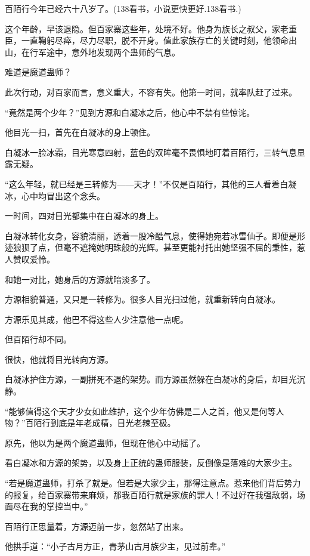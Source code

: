 
\begin{this_body}

百陌行今年已经六十八岁了。(138看书，小说更快更好.138看书.)

这个年龄，早该退隐。但百家寨这些年，处境不好。他身为族长之叔父，家老重臣，一直鞠躬尽瘁，尽力尽职，脱不开身。值此家族存亡的关键时刻，他领命出山，在行军途中，意外地发现两个蛊师的气息。

难道是魔道蛊师？

此次行动，对百家而言，意义重大，不容有失。他第一时间，就率队赶了过来。

“竟然是两个少年？”见到方源和白凝冰之后，他心中不禁有些惊诧。

他目光一扫，首先在白凝冰的身上顿住。

白凝冰一脸冰霜，目光寒意四射，蓝色的双眸毫不畏惧地盯着百陌行，三转气息显露无疑。

“这么年轻，就已经是三转修为——天才！”不仅是百陌行，其他的三人看着白凝冰，心中均冒出这个念头。

一时间，四对目光都集中在白凝冰的身上。

白凝冰转化女身，容貌清丽，透着一股冷酷气息，使得她宛若冰雪仙子。即便是形迹狼狈了点，但毫不遮掩她明珠般的光辉。甚至更能衬托出她坚强不屈的秉性，惹人赞叹爱怜。

和她一对比，她身后的方源就暗淡多了。

方源相貌普通，又只是一转修为。很多人目光扫过他，就重新转向白凝冰。

方源乐见其成，他巴不得这些人少注意他一点呢。

但百陌行却不同。

很快，他就将目光转向方源。

白凝冰护住方源，一副拼死不退的架势。而方源虽然躲在白凝冰的身后，却目光沉静。

“能够值得这个天才少女如此维护，这个少年仿佛是二人之首，他又是何等人物？”百陌行到底是年老成精，目光老辣至极。

原先，他以为是两个魔道蛊师，但现在他心中动摇了。

看白凝冰和方源的架势，以及身上正统的蛊师服装，反倒像是落难的大家少主。

“若是魔道蛊师，打杀了就是。但若是大家少主，那得注意点。惹来他们背后势力的报复，给百家寨带来麻烦，那我百陌行就是家族的罪人！不过好在我强敌弱，场面尽在我的掌控当中。”

百陌行正思量着，方源迈前一步，忽然站了出来。

他拱手道：“小子古月方正，青茅山古月族少主，见过前辈。”


\end{this_body}
